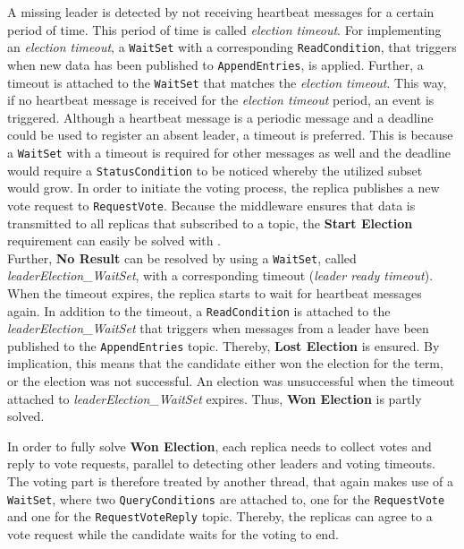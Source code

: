 \noindent
A missing leader is detected by not receiving heartbeat messages for a certain period of time.
This period of time is called \textit{election timeout}.
For implementing an \textit{election timeout}, a \texttt{WaitSet} with a corresponding \texttt{ReadCondition}, that triggers when new data has been published to \texttt{AppendEntries}, is applied.
Further, a timeout is attached to the \texttt{WaitSet} that matches the \textit{election timeout}.
This way, if no heartbeat message is received for the \textit{election timeout} period, an event is triggered.
Although a heartbeat message is a periodic message and a deadline  could be used to register an absent leader, a timeout is preferred.
This is because a \texttt{WaitSet} with a timeout is required for other messages as well and the deadline  would require a \texttt{StatusCondition} to be noticed whereby the utilized  subset would grow.
In order to initiate the voting process, the replica publishes a new vote request to \texttt{RequestVote}.
Because the middleware ensures that data is transmitted to all replicas that subscribed to a topic, the \textbf{Start Election} requirement can easily be solved with .
\\

\noindent
Further, \textbf{No Result} can be resolved by using a \texttt{WaitSet}, called \textit{leaderElection\_WaitSet}, with a corresponding timeout (\textit{leader ready timeout}).
When the timeout expires, the replica starts to wait for heartbeat messages again.
In addition to the timeout, a \texttt{ReadCondition} is attached to the \textit{leaderElection\_WaitSet} that triggers when messages from a leader have been published to the \texttt{AppendEntries} topic.
Thereby, \textbf{Lost Election} is ensured.
By implication, this means that the candidate either won the election for the term, or the election was not successful.
An election was unsuccessful when the timeout attached to \textit{leaderElection\_WaitSet} expires.
Thus, \textbf{Won Election} is partly solved.

In order to fully solve \textbf{Won Election}, each replica needs to collect votes and reply to vote requests, parallel to detecting other leaders and voting timeouts.
The voting part is therefore treated by another  thread, that again makes use of a \texttt{WaitSet}, where two \texttt{QueryConditions} are attached to, one for the \texttt{RequestVote} and one for the \texttt{RequestVoteReply} topic.
Thereby, the replicas can agree to a vote request while the candidate waits for the voting to end.

